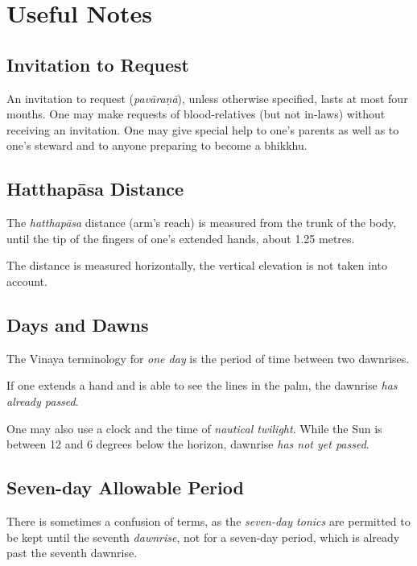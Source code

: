 \chapter{Useful Notes}

\section*{Invitation to Request}

An invitation to request (\emph{pavāraṇā}), unless otherwise specified, lasts at
most four months. One may make requests of blood-relatives (but not in-laws)
without receiving an invitation. One may give special help to one's parents as
well as to one's steward and to anyone preparing to become a bhikkhu.


\section*{Hatthapāsa Distance}

The \emph{hatthapāsa} distance (arm's reach) is measured from the trunk of the
body, until the tip of the fingers of one's extended hands, about 1.25 metres.

The distance is measured horizontally, the vertical elevation is not taken into
account.

\section*{Days and Dawns}

The Vinaya terminology for \emph{one day} is the period of time between two
dawnrises.

If one extends a hand and is able to see the lines in the palm, the dawnrise
\emph{has already passed}.

One may also use a clock and the time of \emph{nautical twilight}. While the Sun
is between 12 and 6 degrees below the horizon, dawnrise \emph{has not yet passed}.

\section*{Seven-day Allowable Period}

There is sometimes a confusion of terms, as the \emph{seven-day tonics} are
permitted to be kept until the seventh \emph{dawnrise}, not for a seven-day
period, which is already past the seventh dawnrise.

